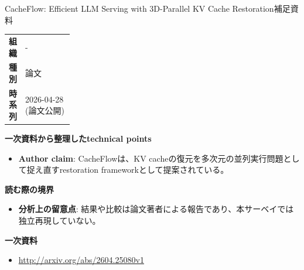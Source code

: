\begin{technicalnote}{CacheFlow: Efficient LLM Serving with 3D-Parallel KV Cache Restoration}{補足資料}
\begingroup
\begin{tabularx}{\linewidth}{@{}>{\bfseries}p{0.22\linewidth}X@{}}
組織 & - \\
種別 & 論文 \\
時系列 & 2026-04-28 (論文公開) \\
\end{tabularx}
\smallskip
{\bfseries 一次資料から整理したtechnical points}
\begin{itemize}[leftmargin=1.5em,itemsep=0.35em]
\item \textbf{Author claim}: CacheFlowは、KV cacheの復元を多次元の並列実行問題として捉え直すrestoration frameworkとして提案されている。
\end{itemize}
\begin{minipage}{\linewidth}
{\bfseries 読む際の境界}
\begin{itemize}[leftmargin=1.5em,itemsep=0.35em]
\item \textbf{分析上の留意点}: 結果や比較は論文著者による報告であり、本サーベイでは独立再現していない。
\end{itemize}
\begin{samepage}
{\bfseries 一次資料}
\begingroup\sloppy
\begin{itemize}[leftmargin=1.5em,itemsep=0.25em]
\item {\scriptsize\url{http://arxiv.org/abs/2604.25080v1}}
\end{itemize}
\endgroup
\end{samepage}
\end{minipage}
\endgroup
\end{technicalnote}
\medskip

